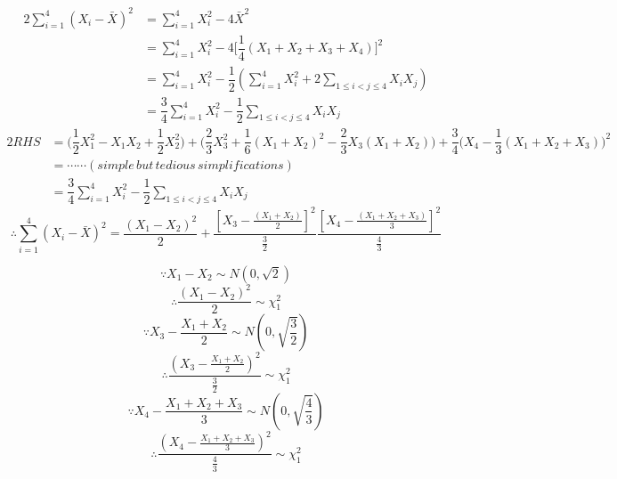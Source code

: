 \documentclass[a4papers]{ctexart}
\begin{document}
\begin{alignat*}{2}
    \sum_{i=1}^{4}\left( X_{i}-\bar {X}\right) ^{2}
    &=\sum ^{4}_{i=1}X^{2}_{i}-4\bar {X}^{2}\\
    &=\sum ^{4}_{i=1}X^{2}_{i}-4\Big[ \dfrac{1}{4}(X_1+X_2+X_3+X_4) \Big]^{2}\\  
    &=\sum ^{4}_{i=1}X^{2}_{i}-\dfrac {1}{2}\left( \sum ^{4}_{i=1}X^{2}_{i}+2\sum _{1\leq i < j\leq 4}X_{i}X_{j}\right) \\
    &=\dfrac {3}{4}\sum ^{4}_{i=1}X^{2}_{i}-\dfrac {1}{2}\sum _{1\leq i < j\leq 4}X_{i}X_{j}
\end{alignat*}
\begin{alignat*}{2}
    RHS  
    &=\Big( \dfrac {1}{2}X_1^{2}-X_{1}X_{2}+\dfrac {1}{2}X^{2}_{2} \Big)
     +\Big( \dfrac {2}{3}X^{2}_{3}+\dfrac {1}{6}\left( X_{1}+X_{2}\right) ^{2}-\dfrac {2}{3}X_{3}\left( X_{1}+X_{2}\right) \Big)
     +\dfrac{3}{4}\Big( X_4-\dfrac{1}{3}(X_1+X_2+X_3) \Big)^2\\
    &=\cdots \cdots(simple\, but\, tedious\, simplifications)\\
    &=\dfrac {3}{4}\sum ^{4}_{i=1}X^{2}_{i}-\dfrac {1}{2}\sum _{1\leq i < j\leq 4}X_{i}X_{j}
\end{alignat*}
\[\therefore 
\sum_{i=1}^{4}\left( X_{i}-\bar {X}\right) ^{2}=
\dfrac {\left( X_{1}-X_{2}\right) ^{2}}{2}+\dfrac {\left[ X_{3}-\frac {\left( X_{1}+X_{2}\right) }{2}\right] ^{2}}{\frac {3}{2}}
    \dfrac {\left[ X_{4}-\frac {\left( X_{1}+X_{2}+X_{3}\right) }{3}\right] ^{2}}{\frac {4}{3}}
  \]

\[\because X_1-X_2\sim N(0,\sqrt{2})\]
\[\therefore \dfrac{(X_1-X_2)^2}{2}\sim \chi_1^2\]
\[\because X_3-\dfrac{X_1+X_2}{2}\sim N(0,\sqrt{\dfrac{3}{2}})\]
\[\therefore \dfrac{(X_3-\frac{X_1+X_2}{2})^2}{\frac{3}{2}} \sim \chi_1^2\]
\[\because X_4-\dfrac{X_1+X_2+X_3}{3}\sim N(0,\sqrt{\dfrac{4}{3}})\]
\[\therefore \dfrac{(X_4-\frac{X_1+X_2+X_3}{3})^2}{\frac{4}{3}} \sim \chi_1^2\]
\end{document}
